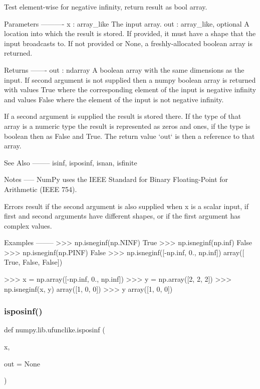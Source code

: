\begin{DoxyVerb}Test element-wise for negative infinity, return result as bool array.

Parameters
----------
x : array_like
    The input array.
out : array_like, optional
    A location into which the result is stored. If provided, it must have a
    shape that the input broadcasts to. If not provided or None, a
    freshly-allocated boolean array is returned.

Returns
-------
out : ndarray
    A boolean array with the same dimensions as the input.
    If second argument is not supplied then a numpy boolean array is
    returned with values True where the corresponding element of the
    input is negative infinity and values False where the element of
    the input is not negative infinity.

    If a second argument is supplied the result is stored there. If the
    type of that array is a numeric type the result is represented as
    zeros and ones, if the type is boolean then as False and True. The
    return value `out` is then a reference to that array.

See Also
--------
isinf, isposinf, isnan, isfinite

Notes
-----
NumPy uses the IEEE Standard for Binary Floating-Point for Arithmetic
(IEEE 754).

Errors result if the second argument is also supplied when x is a scalar
input, if first and second arguments have different shapes, or if the
first argument has complex values.

Examples
--------
>>> np.isneginf(np.NINF)
True
>>> np.isneginf(np.inf)
False
>>> np.isneginf(np.PINF)
False
>>> np.isneginf([-np.inf, 0., np.inf])
array([ True, False, False])

>>> x = np.array([-np.inf, 0., np.inf])
>>> y = np.array([2, 2, 2])
>>> np.isneginf(x, y)
array([1, 0, 0])
>>> y
array([1, 0, 0])\end{DoxyVerb}
 \mbox{\label{namespacenumpy_1_1lib_1_1ufunclike_a8da95d2f19c9a65994dde5c4c5f1c1fb}} 
\subsubsection{\texorpdfstring{isposinf()}{isposinf()}}
{\footnotesize\ttfamily def numpy.\+lib.\+ufunclike.\+isposinf (\begin{DoxyParamCaption}\item[{}]{x,  }\item[{}]{out = {\ttfamily None} }\end{DoxyParamCaption})}

